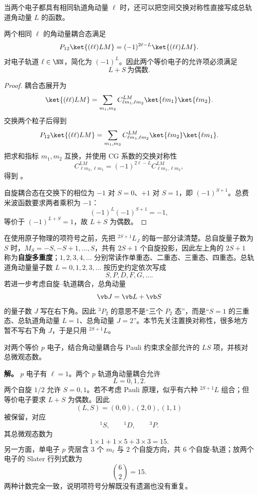 当两个电子都具有相同轨道角动量 $\ell$ 时，还可以把空间交换对称性直接写成总轨道角动量 $L$ 的函数。

\begin{proposition}[两个等价轨道角动量态的交换相位]
两个相同 $\ell$ 的角动量耦合态满足
\begin{equation}
P_{12}\ket{(\ell\ell)LM}
=(-1)^{2\ell-L}\ket{(\ell\ell)LM}.
\label{eq:exchange-coupled-orbital}
\end{equation}
对电子轨道 $\ell\in\NN$，简化为 $(-1)^L$。因此两个等价电子的允许项必须满足
\begin{equation}
L+S\ \text{为偶数}.
\label{eq:equivalent-electron-rule}
\end{equation}

\end{proposition}

\begin{proof}
耦合态展开为
\[
\ket{(\ell\ell)LM}
=\sum_{m_1,m_2}
C^{LM}_{\ell m_1,\ell m_2}
\ket{\ell m_1}\ket{\ell m_2}.
\]
交换两个粒子后得到
\[
P_{12}\ket{(\ell\ell)LM}
=\sum_{m_1,m_2}
C^{LM}_{\ell m_1,\ell m_2}
\ket{\ell m_2}\ket{\ell m_1}.
\]
把求和指标 $m_1,m_2$ 互换，并使用 CG 系数的交换对称性
\[
C^{LM}_{\ell m_2,\ell m_1}
=(-1)^{2\ell-L}C^{LM}_{\ell m_1,\ell m_2},
\]
得到 。

自旋耦合态在交换下的相位为 $-1$ 对 $S=0$、$+1$ 对 $S=1$，即 $(-1)^{S+1}$。总费米波函数要求两者乘积为 $-1$：
\[
(-1)^L(-1)^{S+1}=-1,
\]
等价于 $(-1)^{L+S}=1$，故 $L+S$ 为偶数。
\end{proof}

在使用原子物理的项符号之前，先把 $^{2S+1}L_J$ 的每一部分读清楚。总自旋量子数为 $S$ 时，$M_S=-S,-S+1,\dots,S$，共有 $2S+1$ 个自旋投影，因此左上角的 $2S+1$ 称为\textbf{自旋多重度}；$1,2,3,4,\dots$ 分别常读作单重态、二重态、三重态、四重态。总轨道角动量量子数 $L=0,1,2,3,\dots$ 按历史约定依次写成
\[
S,P,D,F,G,\dots.
\]
若进一步考虑自旋--轨道耦合，总角动量
\[
\vb J=\vb L+\vb S
\]
的量子数 $J$ 写在右下角。因此 $^3P_2$ 的意思不是“三个 $P_2$ 态”，而是“$S=1$ 的三重态、总轨道角动量 $L=1$、总角动量 $J=2$”。本节先关注置换对称性，很多地方暂不写右下角 $J$，于是只用 $^{2S+1}L$。

\begin{example}[{$p^2$ 构型为什么只有 $^1S,^1D,^3P$}]
\label{ex:p2-config}
对两个等价 $p$ 电子，结合角动量耦合与 Pauli 约束求全部允许的 $LS$ 项，并核对总微观态数。

\textbf{解。} $p$ 电子有 $\ell=1$。两个 $p$ 轨道角动量耦合允许
\[
L=0,1,2.
\]
两个自旋 $1/2$ 允许 $S=0,1$。若不考虑 Pauli 原理，似乎有六种 $^{2S+1}L$ 组合；但等价电子要求 $L+S$ 为偶数。因此
\[
(L,S)=(0,0),(2,0),(1,1)
\]
被保留，对应
\[
{}^1S,
\qquad{}^1D,
\qquad{}^3P.
\]
其总微观态数为
\[
1\times1+1\times5+3\times3=15.
\]
另一方面，单电子 $p$ 壳层含 $3$ 个 $m_\ell$ 与 $2$ 个自旋方向，共 $6$ 个自旋-轨道；放两个电子的 Slater 行列式数为
\[
\binom62=15.
\]
两种计数完全一致，说明项符号分解既没有遗漏也没有重复。
\end{example}

